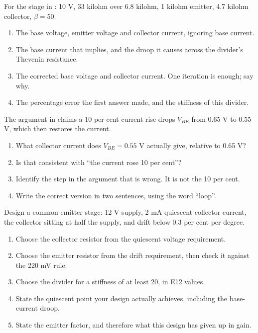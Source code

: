 \label{c6:ex:3}
For the stage in : 10 V, 33 kilohm over 6.8 kilohm, 1 kilohm emitter, 4.7 kilohm collector, $\beta = 50$.

\begin{enumerate}
  \item The base voltage, emitter voltage and collector current, ignoring base current.
  \item The base current that implies, and the droop it causes across the divider's Thevenin resistance.
  \item The corrected base voltage and collector current. One iteration is enough; say why.
  \item The percentage error the first answer made, and the stiffness of this divider.
\end{enumerate}

\label{c6:ex:4}
The argument in  claims a 10 per cent current rise drops $V_{BE}$ from 0.65 V to 0.55 V, which then restores the current.

\begin{enumerate}
  \item What collector current does $V_{BE} = 0.55$ V actually give, relative to 0.65 V?
  \item Is that consistent with ``the current rose 10 per cent''?
  \item Identify the step in the argument that is wrong. It is not the 10 per cent.
  \item Write the correct version in two sentences, using the word ``loop''.
\end{enumerate}

\label{c6:ex:5}
Design a common-emitter stage: 12 V supply, 2 mA quiescent collector current, the collector sitting at half the supply, and drift below 0.3 per cent per degree.

\begin{enumerate}
  \item Choose the collector resistor from the quiescent voltage requirement.
  \item Choose the emitter resistor from the drift requirement, then check it against the 220 mV rule.
  \item Choose the divider for a stiffness of at least 20, in E12 values.
  \item State the quiescent point your design actually achieves, including the base-current droop.
  \item State the emitter factor, and therefore what this design has given up in gain.
\end{enumerate}

